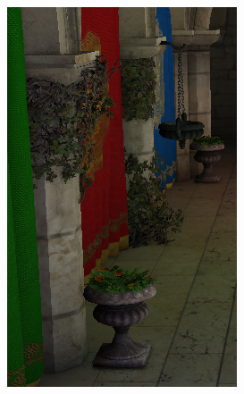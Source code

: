 \begin{figure}[htb]
\begin{subfigure}[b]{0.333\textwidth}
        \includegraphics[width=.95\textwidth]{screenshots/interleaved_without_textured}%
        \caption{}
        \label{fig:results:interleaved_without_textured}%
    \end{subfigure}%
    \begin{subfigure}[b]{0.333\textwidth}
        \centering

\end{subfigure}
\end{figure}
